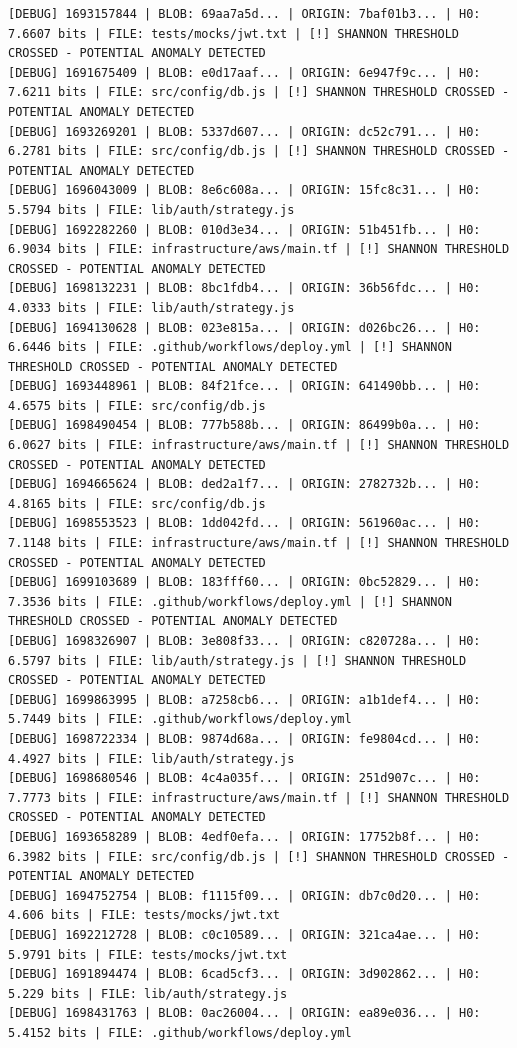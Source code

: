 \documentclass[12pt, a4paper, oneside]{report}
\begin{document}
\begin{lstlisting}[basicstyle=\tiny\ttfamily]
[DEBUG] 1693157844 | BLOB: 69aa7a5d... | ORIGIN: 7baf01b3... | H0: 7.6607 bits | FILE: tests/mocks/jwt.txt | [!] SHANNON THRESHOLD CROSSED - POTENTIAL ANOMALY DETECTED
[DEBUG] 1691675409 | BLOB: e0d17aaf... | ORIGIN: 6e947f9c... | H0: 7.6211 bits | FILE: src/config/db.js | [!] SHANNON THRESHOLD CROSSED - POTENTIAL ANOMALY DETECTED
[DEBUG] 1693269201 | BLOB: 5337d607... | ORIGIN: dc52c791... | H0: 6.2781 bits | FILE: src/config/db.js | [!] SHANNON THRESHOLD CROSSED - POTENTIAL ANOMALY DETECTED
[DEBUG] 1696043009 | BLOB: 8e6c608a... | ORIGIN: 15fc8c31... | H0: 5.5794 bits | FILE: lib/auth/strategy.js
[DEBUG] 1692282260 | BLOB: 010d3e34... | ORIGIN: 51b451fb... | H0: 6.9034 bits | FILE: infrastructure/aws/main.tf | [!] SHANNON THRESHOLD CROSSED - POTENTIAL ANOMALY DETECTED
[DEBUG] 1698132231 | BLOB: 8bc1fdb4... | ORIGIN: 36b56fdc... | H0: 4.0333 bits | FILE: lib/auth/strategy.js
[DEBUG] 1694130628 | BLOB: 023e815a... | ORIGIN: d026bc26... | H0: 6.6446 bits | FILE: .github/workflows/deploy.yml | [!] SHANNON THRESHOLD CROSSED - POTENTIAL ANOMALY DETECTED
[DEBUG] 1693448961 | BLOB: 84f21fce... | ORIGIN: 641490bb... | H0: 4.6575 bits | FILE: src/config/db.js
[DEBUG] 1698490454 | BLOB: 777b588b... | ORIGIN: 86499b0a... | H0: 6.0627 bits | FILE: infrastructure/aws/main.tf | [!] SHANNON THRESHOLD CROSSED - POTENTIAL ANOMALY DETECTED
[DEBUG] 1694665624 | BLOB: ded2a1f7... | ORIGIN: 2782732b... | H0: 4.8165 bits | FILE: src/config/db.js
[DEBUG] 1698553523 | BLOB: 1dd042fd... | ORIGIN: 561960ac... | H0: 7.1148 bits | FILE: infrastructure/aws/main.tf | [!] SHANNON THRESHOLD CROSSED - POTENTIAL ANOMALY DETECTED
[DEBUG] 1699103689 | BLOB: 183fff60... | ORIGIN: 0bc52829... | H0: 7.3536 bits | FILE: .github/workflows/deploy.yml | [!] SHANNON THRESHOLD CROSSED - POTENTIAL ANOMALY DETECTED
[DEBUG] 1698326907 | BLOB: 3e808f33... | ORIGIN: c820728a... | H0: 6.5797 bits | FILE: lib/auth/strategy.js | [!] SHANNON THRESHOLD CROSSED - POTENTIAL ANOMALY DETECTED
[DEBUG] 1699863995 | BLOB: a7258cb6... | ORIGIN: a1b1def4... | H0: 5.7449 bits | FILE: .github/workflows/deploy.yml
[DEBUG] 1698722334 | BLOB: 9874d68a... | ORIGIN: fe9804cd... | H0: 4.4927 bits | FILE: lib/auth/strategy.js
[DEBUG] 1698680546 | BLOB: 4c4a035f... | ORIGIN: 251d907c... | H0: 7.7773 bits | FILE: infrastructure/aws/main.tf | [!] SHANNON THRESHOLD CROSSED - POTENTIAL ANOMALY DETECTED
[DEBUG] 1693658289 | BLOB: 4edf0efa... | ORIGIN: 17752b8f... | H0: 6.3982 bits | FILE: src/config/db.js | [!] SHANNON THRESHOLD CROSSED - POTENTIAL ANOMALY DETECTED
[DEBUG] 1694752754 | BLOB: f1115f09... | ORIGIN: db7c0d20... | H0: 4.606 bits | FILE: tests/mocks/jwt.txt
[DEBUG] 1692212728 | BLOB: c0c10589... | ORIGIN: 321ca4ae... | H0: 5.9791 bits | FILE: tests/mocks/jwt.txt
[DEBUG] 1691894474 | BLOB: 6cad5cf3... | ORIGIN: 3d902862... | H0: 5.229 bits | FILE: lib/auth/strategy.js
[DEBUG] 1698431763 | BLOB: 0ac26004... | ORIGIN: ea89e036... | H0: 5.4152 bits | FILE: .github/workflows/deploy.yml
\end{lstlisting}
\end{document}
